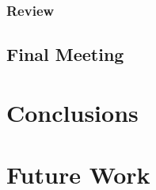 \documentclass[a4paper, 12pt]{article}
\begin{document}
\subsubsection{Review}

\subsection{Final Meeting}

\section{Conclusions}
\label{sec:conclusions}

\newpage

\section{Future Work}

\newpage

\sloppy
\printbibliography
\end{document}
